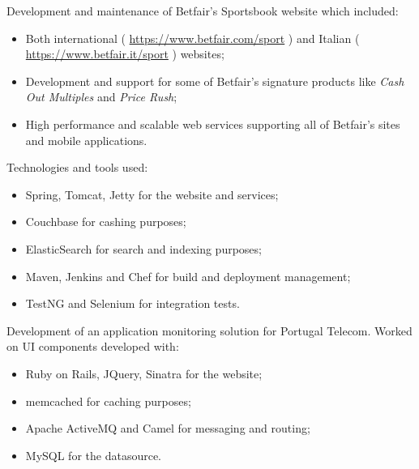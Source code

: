 \documentclass[a4paper,10pt]{memoir} %
\begin{document}
{Development and maintenance of Betfair's Sportsbook website which included:
\begin{itemize}
  \item Both international ( \url{https://www.betfair.com/sport} ) and Italian ( \url{https://www.betfair.it/sport} ) websites;
  \item Development and support for some of Betfair's signature products like \emph{Cash Out Multiples} and \emph{Price Rush};
  \item High performance and scalable web services supporting all of Betfair's sites and mobile applications.
\end{itemize}
Technologies and tools used:
\begin{itemize}
  \item Spring, Tomcat, Jetty for the website and services;
  \item Couchbase for cashing purposes;
  \item ElasticSearch for search and indexing purposes;
  \item Maven, Jenkins and Chef for build and deployment management;
  \item TestNG and Selenium for integration tests.
\end{itemize}
}


\clearpage %

\userinformation %

\framebreak %


{Development of an application monitoring solution for Portugal Telecom. Worked on UI components developed with:
\begin{itemize}
\item Ruby on Rails, JQuery, Sinatra for the website;
\item memcached for caching purposes;
\item Apache ActiveMQ and Camel for messaging and routing;
\item MySQL for the datasource.
\end{itemize}
}
\end{document}

